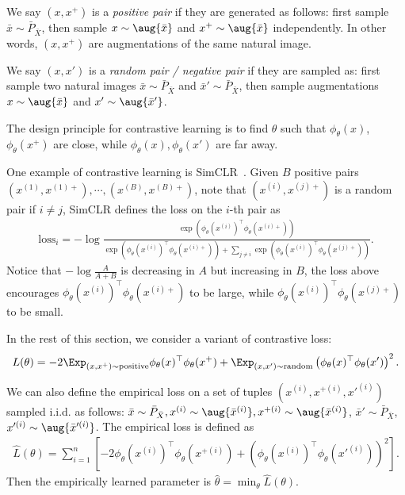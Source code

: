 We say $(x, x^+)$ is a \emph{positive pair} if they are generated as follows: first sample $\bar{x}\sim \bar{P}_{\bar{X}}$, then sample $x\sim\aug{\bar{x}}$ and $x^+\sim\aug{\bar{x}}$ independently. In other words, $(x, x^+)$ are augmentations of the same natural image.

We say $(x, x')$ is a \emph{random pair / negative pair} if they are sampled as: first sample two natural images $\bar{x}\sim \bar{P}_{\bar{X}}$ and $\bar{x}'\sim \bar{P}_{\bar{X}}$, then sample augmentations $x\sim\aug{\bar{x}}$ and $x'\sim\aug{\bar{x}'}$.

The design principle for contrastive learning is to find $\theta$ such that $\phi_{\theta}(x)$, $\phi_{\theta}(x^+)$ are close, while $\phi_{{\theta}}(x), \phi_{{\theta}}(x')$ are far away. 

One example of contrastive learning is SimCLR~\citep{chen2020simclr}.  Given $B$ positive pairs $(x^{(1)}, x^{(1)+}), \cdots, (x^{(B)}, x^{(B)+})$, note that $(x^{(i)}, x^{(j)+})$ is a random pair if $i\ne j$, SimCLR defines the loss on the $i$-th pair as 
\begin{align}
	\text{loss}_i = -\log\frac{\exp(\phi_{{\theta}}(x^{(i)})^\top \phi_{{\theta}}(x^{(i)+}))}{\exp(\phi_{{\theta}}(x^{(i)})^\top \phi_{{\theta}}(x^{(i)+}))+ \sum_{j\ne i} \exp(\phi_{{\theta}}(x^{(i)})^\top \phi_{{\theta}}(x^{(j)+}))}.
\end{align}
Notice that $-\log\frac{A}{A+B}$ is decreasing in $A$ but increasing in $B$, the loss above encourages $\phi_{{\theta}}(x^{(i)})^\top \phi_{{\theta}}(x^{(i)+})$ to be large, while $\phi_{{\theta}}(x^{(i)})^\top \phi_{{\theta}}(x^{(j)+})$ to be small.

In the rest of this section, we consider a variant of contrastive loss: 
\begin{align}
	L(\theta)  = -2\Exp_{(x, x^+) \sim\text{positive}} \phi_{{\theta}}(x)^\top \phi_{{\theta}}(x^+) + \Exp_{(x, x') \sim\text{random}}  \left(\phi_{{\theta}}(x)^\top \phi_{{\theta}}(x')\right)^2.
\end{align}

We can also define the empirical loss on a set of tuples $(x^{(i)}, x^{+(i)}, x'^{(i)})$ sampled i.i.d. as follows: $\bar{x}\sim\bar{P}_{\bar{X}}, x^{(i)}\sim\aug{\bar{x}^{(i)}}, x^{+(i)}\sim\aug{\bar{x}^{(i)}}$, $\bar{x}'\sim\bar{P}_{\bar{X}}$, $x'^{(i)}\sim\aug{\bar{x}'^{(i)}}$. The empirical loss is defined as 
\begin{align}
	\hat{L}(\theta) = \sum_{i=1}^n \left[-2\phi_{{\theta}}(x^{(i)})^\top \phi_{{\theta}}(x^{+(i)}) + \left(\phi_{{\theta}}(x^{(i)})^\top \phi_{{\theta}}(x'^{(i)})\right)^2\right].
\end{align}
Then the empirically learned parameter is $\hat{\theta} = \min_{\theta} \hat{L}(\theta)$. 


